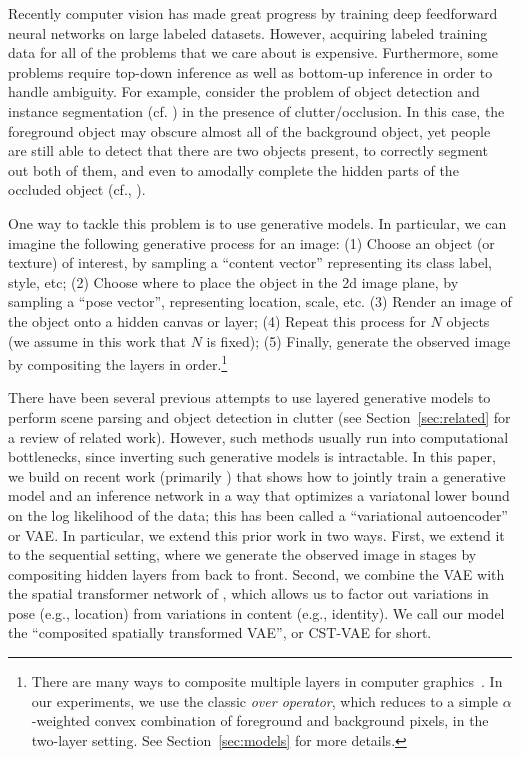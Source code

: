 

Recently computer vision has made great progress by training deep
feedforward neural networks on large labeled datasets.
However, acquiring labeled training data for all of the problems that
we care about is expensive.
Furthermore, some problems require top-down inference as well as
bottom-up inference in order to handle ambiguity.
For example, consider the problem of object detection
and instance segmentation (cf. \cite{Hariharan2014})  in the
presence of clutter/occlusion. 
In this case, the foreground object may
obscure almost all of the background object, yet people are still able
to detect that there are two objects present, to correctly segment
out both of them, and even to amodally complete the hidden parts of
the occluded object (cf., \cite{Kar2015}).

One way to tackle this problem is to use generative models.
In particular, we can imagine the following generative process for an image:
(1) Choose an object (or texture) of interest, by sampling a ``content vector''
representing its class label, style, etc;
(2) Choose where to
place the object in the 2d image plane, by sampling a ``pose vector'',
representing location, scale, etc. 
(3) Render an image of the object onto a hidden canvas or layer;
(4) Repeat this process for $N$
objects (we assume in this work that $N$ is fixed);
(5) Finally, generate
the observed image by compositing the layers in order.\footnote{
%
There are many  ways to composite multiple layers in computer
graphics~\citep{porter1984compositing}. 
In our experiments, we use  the classic \emph{over operator}, which
reduces to a simple $\alpha$-weighted 
convex combination of foreground and background pixels,
in the two-layer setting.
 See Section~\ref{sec:models} for more details.
}

There have been several previous attempts to use layered generative
models to perform scene parsing and object detection in clutter (see
Section~\ref{sec:related} for a review of related work). However, such
methods usually run into computational bottlenecks, since inverting
such generative models is intractable.
In this paper, we build on recent work (primarily \cite{Kingma2014,gregor2015draw})
that shows how to jointly train a generative model and an inference
network in a way that optimizes a variatonal lower bound on the log
likelihood of the data;
this has been called a ``variational autoencoder'' or VAE.
In particular, we extend this prior work in
two ways. First, we extend it to the sequential setting, where we
generate the observed image in stages by compositing hidden layers
from back to front.
Second, we combine the VAE with the spatial transformer network of
\citep{jaderberg2015spatial}, which allows us to factor out variations
in pose (e.g., location) from variations in content (e.g., identity).
We call our model the ``composited spatially transformed VAE'', or CST-VAE
for short.

